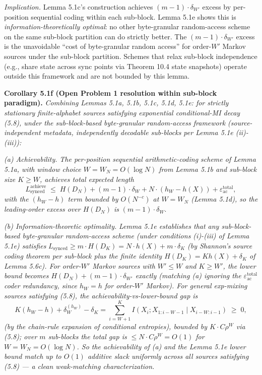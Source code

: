 \documentclass[
]{article}
\begin{document}
\emph{Implication.} Lemma 5.1c's construction achieves
$(m-1) \cdot \delta_{W'}$ excess by per-position sequential coding
within each sub-block. Lemma 5.1e shows this is
\emph{information-theoretically optimal}: no other byte-granular
random-access scheme on the same sub-block partition can do strictly
better. The $(m-1) \cdot \delta_{W'}$ excess is the unavoidable
``cost of byte-granular random access'' for order-$W'$ Markov sources
under the sub-block partition. Schemes that relax sub-block
independence (e.g., share state across sync points via Theorem 10.4
state snapshots) operate outside this framework and are not bounded
by this lemma.

\textbf{Corollary 5.1f (Open Problem 1 resolution within sub-block
paradigm).} \emph{Combining Lemmas 5.1a, 5.1b, 5.1c, 5.1d, 5.1e: for
strictly stationary finite-alphabet sources satisfying exponential
conditional-MI decay (5.8), under the sub-block-based byte-granular
random-access framework (source-independent metadata, independently
decodable sub-blocks per Lemma 5.1e (ii)-(iii)):}

\emph{(a) Achievability.} \emph{The per-position sequential
arithmetic-coding scheme of Lemma 5.1a, with window choice
$W = W_N = O(\log N)$ from Lemma 5.1b and sub-block size $K \geq W$,
achieves total expected length}
\[
L_{\mathrm{synced}}^{\mathrm{achieve}} \;\leq\; H(D_N) + (m-1) \cdot \delta_{W} + N \cdot (h_W - h(X)) + \varepsilon_{\mathrm{ac}}^{\mathrm{total}},
\]
\emph{with the $(h_W - h)$ term bounded by $O(N^{-c})$ at $W = W_N$
(Lemma 5.1d), so the leading-order excess over $H(D_N)$ is}
$(m-1) \cdot \delta_W$.

\emph{(b) Information-theoretic optimality.} \emph{Lemma 5.1e
establishes that any sub-block-based byte-granular random-access
scheme (under conditions (i)-(iii) of Lemma 5.1e) satisfies}
$L_{\mathrm{synced}} \geq m \cdot H(D_K) = N \cdot h(X) + m \cdot \delta_K$
\emph{(by Shannon's source coding theorem per sub-block plus the
finite identity $H(D_K) = K h(X) + \delta_K$ of Lemma 5.6c). For
order-$W'$ Markov sources with $W' \leq W$ and $K \geq W'$, the
lower bound becomes $H(D_N) + (m-1) \cdot \delta_{W'}$ exactly
(matching (a) ignoring the $\varepsilon_{\mathrm{ac}}^{\mathrm{total}}$
coder redundancy, since $h_W = h$ for order-$W'$ Markov). For general
exp-mixing sources satisfying (5.8), the achievability-vs-lower-bound
gap is}
\[
K (h_W - h) + \delta_W^{(h_W)} - \delta_K
= \sum_{i=W+1}^K I(X_i; X_{1:i-W-1} \mid X_{i-W:i-1}) \;\geq\; 0,
\]
\emph{(by the chain-rule expansion of conditional entropies), bounded
by $K \cdot C \rho^W$ via (5.8); over $m$ sub-blocks the total gap is
$\leq N \cdot C \rho^W = O(1)$ for $W = W_N = O(\log N)$. So the
achievability of (a) and the Lemma 5.1e lower bound match up to
$O(1)$ additive slack uniformly across all sources satisfying (5.8) ---
a clean weak-matching characterization.}
\end{document}
